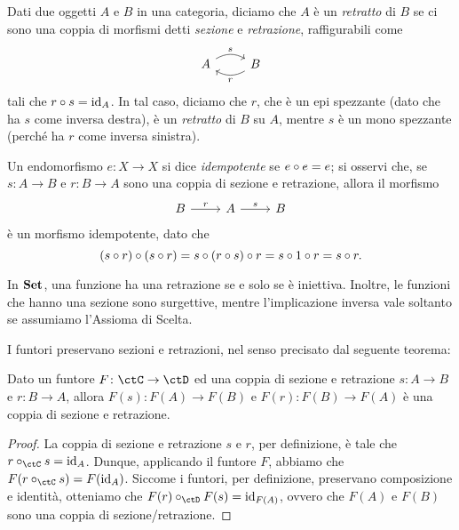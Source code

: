 \begin{definition}[Retratto]
	Dati due oggetti \(A\) e \(B\) in una categoria,
	diciamo che \(A\) è un \emph{retratto} di \(B\) se ci sono una coppia di morfismi detti \emph{sezione} e \emph{retrazione}, raffigurabili come
	\begin{equation}
		\begin{tikzcd}
			A \ar[r, bend left, "s"] &B \ar[l, bend left, "r"]
		\end{tikzcd}
	\end{equation}
	tali che \(r \circ s = \mathrm{id}_A\).
	In tal caso, diciamo che \(r\), che è un epi spezzante (dato che ha \(s\) come inversa destra), è un \emph{retratto} di \(B\) su \(A\), mentre \(s\) è un mono spezzante (perché ha \(r\) come inversa sinistra).
\end{definition}
\begin{remark}
	Un endomorfismo \(e : X\to X\) si dice \emph{idempotente} se \(e\circ e=e\); si osservi che, se \(s \colon A \to B\) e \(r \colon B \to A\) sono una coppia di sezione e retrazione,
	allora il morfismo
	\begin{equation}
		\begin{tikzcd}
			B \ar[r, "r"] & A \ar[r, "s"] &B
		\end{tikzcd}
	\end{equation}
	è un morfismo idempotente, dato che
	\[(s\circ r)\circ (s\circ r) = s\circ (r\circ s)\circ r = s\circ 1\circ r=s\circ r.\]
\end{remark}

\begin{example}
	\label{exm:set-sezioni-retrazioni}
	In \(\mathbf{Set}\), una funzione ha una retrazione se e solo se è iniettiva.
	Inoltre, le funzioni che hanno una sezione sono surgettive,
	mentre l'implicazione inversa vale soltanto se assumiamo l'Assioma di Scelta.
\end{example}

I funtori preservano sezioni e retrazioni,
nel senso precisato dal seguente teorema:

\begin{theorem}%
	\label{thm:fun-sezioni-retrazioni}
	Dato un funtore \(F \colon \ctC \to \ctD\) ed una coppia di sezione e retrazione \(s \colon A \to B\) e \(r \colon B \to A\),
	allora \(F(s) \colon F(A) \to F(B)\) e \(F(r) \colon F(B) \to F(A)\) è una coppia di sezione e retrazione.
\end{theorem}
\begin{proof}
	La coppia di sezione e retrazione \(s\) e \(r\),
	per definizione, è tale che \(r \cmp_{\ctC} s = \id_A\).
	Dunque, applicando il funtore \(F\), abbiamo che \(F(r \cmp_{\ctC} s) = F(\id_A)\).
	Siccome i funtori, per definizione, preservano composizione e identità,
	otteniamo che \(F(r) \cmp_{\ctD} F(s) = \id_{F(A)}\),
	ovvero che \(F(A)\) e \(F(B)\) sono una coppia di sezione/retrazione.
\end{proof}

